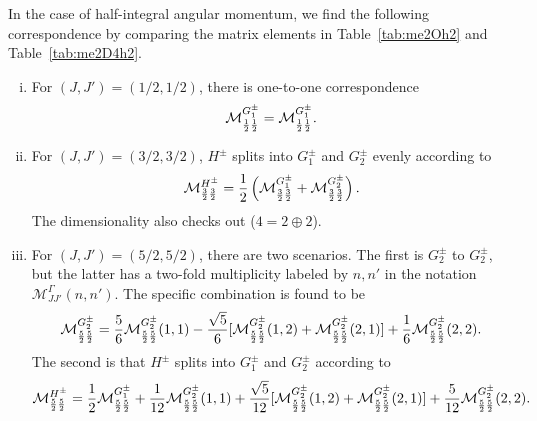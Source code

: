 \documentclass[aps,prd,reprint,showpacs,floatfix,longbibliography,,superscriptaddress]{revtex4-1}
\def\mm{\mathcal{M}}
\def\beq{\begin{equation}}
\def\eeq{\end{equation}}
\def\beqs#1\eeqs{\beq\begin{split} #1 \end{split}\eeq}
\begin{document}
\begin{widetext}
In the case of half-integral angular momentum, 
we find the following correspondence by comparing the matrix elements in Table~\ref{tab:me2Oh2} and  Table~\ref{tab:me2D4h2}.
\begin{enumerate}[(i)]
\item
For $(J,J')=(1/2,1/2)$, there is one-to-one correspondence  
\beq \mm^{G^\pm_1}_{{1\over 2}{1\over 2}} = \mm^{G^\pm_1}_{{1\over 2}{1\over 2}}. \eeq
\item
For $(J,J')=(3/2,3/2)$, $H^\pm$ splits into $G^\pm_1$ and $G^\pm_2$ evenly according to 
\beq \mm^{H^\pm}_{{3\over 2}{3\over 2}} = {1\over 2} \left(\mm^{G^\pm_1}_{{3\over 2}{3\over 2}} + \mm^{G^\pm_2}_{{3\over 2}{3\over 2}}\right). \eeq
The dimensionality also checks out ($4=2\oplus 2$).
\item
For $(J,J')=(5/2,5/2)$, there are two scenarios.  
The first is $G^\pm_2$ to $G^\pm_2$, but the latter has a two-fold multiplicity labeled by $n,n'$ in the notation $\mm^{\Gamma}_{JJ'}(n,n')$.  The specific combination is found to be 
\beq
\mm^{G^\pm_2}_{{5\over 2}{5\over 2}}  =  {5\over 6} \mm^{G^\pm_2}_{{5\over 2}{5\over 2}} (1,1) - {\sqrt{5}\over 6}[ \mm^{G^\pm_2}_{{5\over 2}{5\over 2}}(1,2)+ \mm^{G^\pm_2}_{{5\over 2}{5\over 2}}(2,1)] + {1\over 6} \mm^{G^\pm_2}_{{5\over 2}{5\over 2}}(2,2). 
\eeq
The second is that $H^\pm$ splits into $G^\pm_1$ and $G^\pm_2$ according to 
\beq
\mm^{H^\pm}_{{5\over 2}{5\over 2}}  =  {1\over 2} \mm^{G^\pm_1}_{{5\over 2}{5\over 2}}
+ {1\over 12} \mm^{G^\pm_2}_{{5\over 2}{5\over 2}} (1,1) + {\sqrt{5}\over 12} [\mm^{G^\pm_2}_{{5\over 2}{5\over 2}}(1,2)+ \mm^{G^\pm_2}_{{5\over 2}{5\over 2}}(2,1)] + {5\over 12} \mm^{G^\pm_2}_{{5\over 2}{5\over 2}}(2,2). 
\eeq



\end{enumerate}
\end{widetext}
\end{document}
